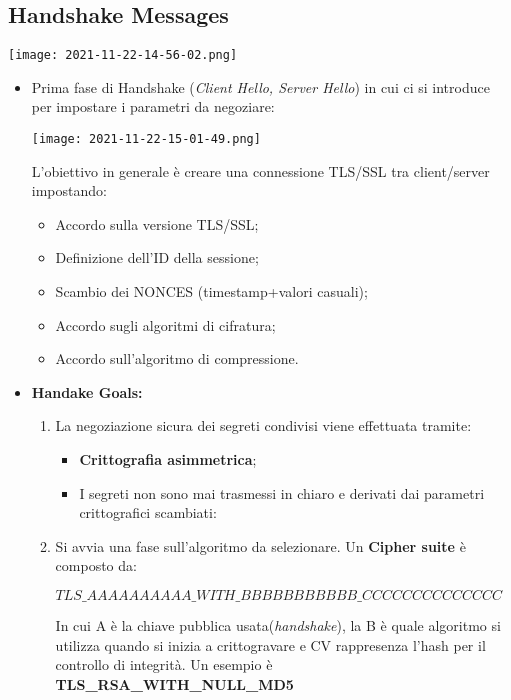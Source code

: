 \documentclass{article}
\theoremstyle{remark}
\begin{document}
\subsection{Handshake Messages}
\begin{center}
	\texttt{[image: 2021-11-22-14-56-02.png]}
\end{center}
\begin{itemize}
	\item Prima fase di Handshake (\emph{Client Hello, Server Hello}) in cui ci si introduce per impostare i parametri da negoziare:
	      \begin{center}
		      \texttt{[image: 2021-11-22-15-01-49.png]}
	      \end{center}
	      L'obiettivo in generale è creare una connessione TLS/SSL tra client/server impostando:\begin{itemize}
		      \item Accordo sulla versione TLS/SSL;
		      \item Definizione dell'ID della sessione;
		      \item Scambio dei NONCES (timestamp+valori casuali);
		      \item Accordo sugli algoritmi di cifratura;
		      \item Accordo sull'algoritmo di compressione.
	      \end{itemize}
	\item \textbf{Handake Goals:}\begin{enumerate}
		      \item La negoziazione sicura dei segreti condivisi viene effettuata tramite:
		            \begin{itemize}
			            \item \textbf{Crittografia asimmetrica};
			            \item  I segreti non sono mai trasmessi in chiaro e derivati dai parametri crittografici scambiati:
		            \end{itemize}
		      \item Si avvia una fase sull'algoritmo da selezionare. Un \textbf{Cipher suite} è composto da:\begin{center}
			            \(TLS\_AAAAAAAAAA\_WITH\_BBBBBBBBBBB\_CCCCCCCCCCCCCC\)
		            \end{center}
		            In cui A è la chiave pubblica usata(\emph{handshake}), la B è quale algoritmo si utilizza quando si inizia a crittogravare e CV rappresenza l'hash per il controllo di integrità.
		            Un esempio è \textbf{TLS\_RSA\_WITH\_NULL\_MD5}
	      \end{enumerate}
\end{itemize}
\end{document}
